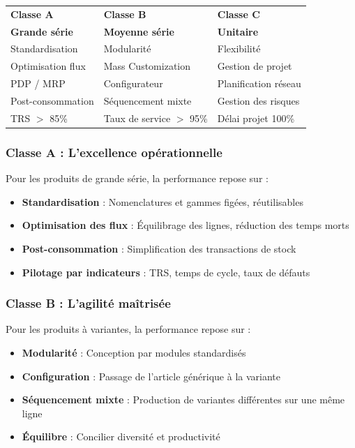 \documentclass{article}
\begin{document}
\begin{table}[h]
\begin{tcolorbox}[colback=blueclair, colframe=blue!70!black, title=Synthèse des trois classes]
\begin{center}
\begin{tabular}{|p{}|p{}|p{}|}
\hline
\textbf{Classe A} & \textbf{Classe B} & \textbf{Classe C} \\
\textbf{Grande série} & \textbf{Moyenne série} & \textbf{Unitaire} \\
\hline
Standardisation & Modularité & Flexibilité \\
Optimisation flux & Mass Customization & Gestion de projet \\
PDP / MRP & Configurateur & Planification réseau \\
Post-consommation & Séquencement mixte & Gestion des risques \\
TRS $>$ 85\% & Taux de service $>$ 95\% & Délai projet 100\% \\
\hline
\end{tabular}
\end{center}
\end{tcolorbox}

\subsubsection{Classe A : L'excellence opérationnelle}

Pour les produits de grande série, la performance repose sur :
\begin{itemize}
    \item \textbf{Standardisation} : Nomenclatures et gammes figées, réutilisables
    \item \textbf{Optimisation des flux} : Équilibrage des lignes, réduction des temps morts
    \item \textbf{Post-consommation} : Simplification des transactions de stock
    \item \textbf{Pilotage par indicateurs} : TRS, temps de cycle, taux de défauts
\end{itemize}

\subsubsection{Classe B : L'agilité maîtrisée}

Pour les produits à variantes, la performance repose sur :
\begin{itemize}
    \item \textbf{Modularité} : Conception par modules standardisés
    \item \textbf{Configuration} : Passage de l'article générique à la variante
    \item \textbf{Séquencement mixte} : Production de variantes différentes sur une même ligne
    \item \textbf{Équilibre} : Concilier diversité et productivité
\end{itemize}


\end{table}
\end{document}
